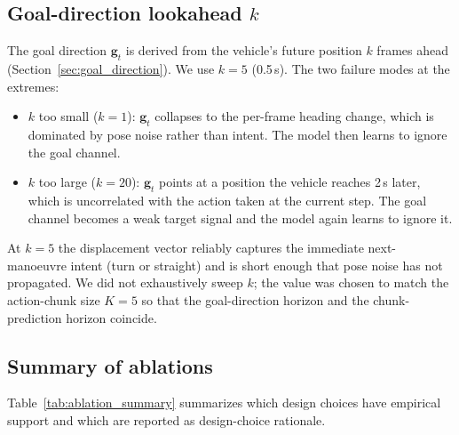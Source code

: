 \documentclass[sensors,article,submit,pdftex,moreauthors]{Definitions/mdpi}
\providecommand{\DIFadd}[1]{{\protect\color{red}#1}} %
\begin{document}
\subsection{\DIFadd{Goal-direction lookahead $k$}}
\label{sec:ablation_goal}

\DIFadd{The goal direction $\mathbf{g}_t$ is derived from the vehicle's future position $k$ frames ahead (Section~\ref{sec:goal_direction}). We use $k{=}5$ (0.5\,s). The two failure modes at the extremes:
}\begin{itemize}
    \item \DIFadd{$k$ too small ($k{=}1$): $\mathbf{g}_t$ collapses to the per-frame heading change, which is dominated by pose noise rather than intent. The model then learns to ignore the goal channel.
    }\item \DIFadd{$k$ too large ($k{=}20$): $\mathbf{g}_t$ points at a position the vehicle reaches 2\,s later, which is uncorrelated with the action taken at the current step. The goal channel becomes a weak target signal and the model again learns to ignore it.
}\end{itemize}
\DIFadd{At $k{=}5$ the displacement vector reliably captures the immediate next-manoeuvre intent (turn or straight) and is short enough that pose noise has not propagated. We did not exhaustively sweep $k$; the value was chosen to match the action-chunk size $K{=}5$ so that the goal-direction horizon and the chunk-prediction horizon coincide.
}

\subsection{\DIFadd{Summary of ablations}}

\DIFadd{Table~\ref{tab:ablation_summary} summarizes which design choices have empirical support and which are reported as design-choice rationale.
}
\end{document}
